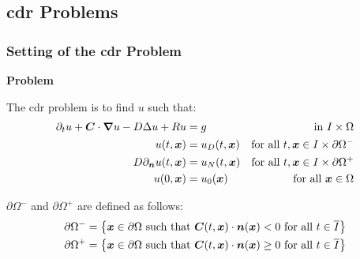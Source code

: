 \subsection{\texorpdfstring{\acrlong{cdr}}{} Problems}

\begin{frame}
    \frametitle{Setting of the \acrlong{cdr} Problem}

    \vspace*{\fill}
    \begin{center}
        {\color{\accentcolor} \Large \textbf{Problem}}
        \vspace*{0.25cm}

        \begin{minipage}{0.75\textwidth}
            \begin{definition}
                The \acrshort{cdr} problem is to find $u$ such that:
                \begin{align*}
                    \partial_t u + \bm{C} \cdot \bm{\nabla} u - D \Delta u + R u &= g &\text{ in } I \times \Omega \\ 
                    u(t, \bm{x}) &= u_D(t, \bm{x}) &\text{for all } t, \bm{x} \in I \times \partial \Omega^- \\
                    D \partial_{\bm{n}} u(t, \bm{x}) &= u_N(t, \bm{x}) &\text{for all } t, \bm{x} \in I \times \partial \Omega^+ \\
                    u(0, \bm{x}) &= u_0(\bm{x}) &\text{for all } \bm{x} \in \Omega
                \end{align*}
            \end{definition}
        \end{minipage}
    \end{center}

    \vspace*{\fill}

    \begin{center}
        \begin{minipage}{0.75\textwidth}
            \begin{definition}
                $\partial \Omega^-$ and $\partial \Omega^+$ are defined as follows: 
                \begin{align*}
                    \partial \Omega^- = \left\{ \bm{x} \in \partial \Omega \text{ such that } \bm{C}(t, \bm{x}) \cdot \bm{n}(\bm{x}) < 0 \text{ for all } t \in \overline{I} \right\} \\
                    \partial \Omega^+ = \left\{ \bm{x} \in \partial \Omega \text{ such that } \bm{C}(t, \bm{x}) \cdot \bm{n}(\bm{x}) \geq 0 \text{ for all } t \in \overline{I} \right\}
                \end{align*}
            \end{definition}
        \end{minipage}
    \end{center}
    \vspace*{\fill}
    
\end{frame}

